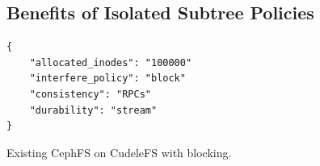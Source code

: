 %
%
%
%
%
%
%
%
%
%
%

\subsection{Benefits of Isolated Subtree Policies}

\begin{listing}[tb]
\begin{verbatim}
{     
    "allocated_inodes": "100000"
    "interfere_policy": "block"
    "consistency": "RPCs"
    "durability": "stream"
}
\end{verbatim}
\caption{Existing CephFS on CudeleFS with blocking.}
\label{src:block}
\end{listing}

